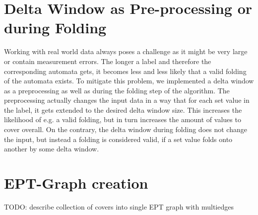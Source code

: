 \section{Delta Window as Pre-processing or during Folding}
\label{ch:novel-algos:delta-window}
Working with real world data always poses a challenge as it might be very large or contain measurement errors. The longer a label and therefore the corresponding automata gets, it becomes less and less likely that a valid folding of the automata exists. To mitigate this problem, we implemented a delta window as a preprocessing as well as during the folding step of the algorithm. The preprocessing actually changes the input data in a way that for each set value in the label, it gets extended to the desired delta window size. This increases the likelihood of e.g. a valid folding, but in turn increases the amount of values to cover overall. On the contrary, the delta window during folding does not change the input, but instead a folding is considered valid, if a set value folds onto another by some delta window.

\section{EPT-Graph creation}
\label{ch:novel-algos:ept-graph}
TODO: describe collection of covers into single EPT graph with multiedges
